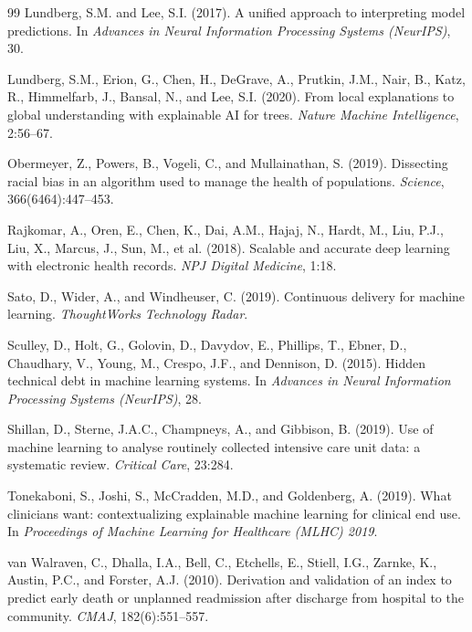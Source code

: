 \documentclass[11pt,letterpaper]{article}
\begin{document}
\begin{thebibliography}{99}
Lundberg, S.M. and Lee, S.I. (2017).
\newblock A unified approach to interpreting model predictions.
\newblock In \textit{Advances in Neural Information Processing Systems (NeurIPS)}, 30.

Lundberg, S.M., Erion, G., Chen, H., DeGrave, A., Prutkin, J.M., Nair, B., Katz, R., Himmelfarb, J., Bansal, N., and Lee, S.I. (2020).
\newblock From local explanations to global understanding with explainable AI for trees.
\newblock \textit{Nature Machine Intelligence}, 2:56--67.

Obermeyer, Z., Powers, B., Vogeli, C., and Mullainathan, S. (2019).
\newblock Dissecting racial bias in an algorithm used to manage the health of populations.
\newblock \textit{Science}, 366(6464):447--453.

Rajkomar, A., Oren, E., Chen, K., Dai, A.M., Hajaj, N., Hardt, M., Liu, P.J., Liu, X., Marcus, J., Sun, M., et al. (2018).
\newblock Scalable and accurate deep learning with electronic health records.
\newblock \textit{NPJ Digital Medicine}, 1:18.

Sato, D., Wider, A., and Windheuser, C. (2019).
\newblock Continuous delivery for machine learning.
\newblock \textit{ThoughtWorks Technology Radar}.

Sculley, D., Holt, G., Golovin, D., Davydov, E., Phillips, T., Ebner, D., Chaudhary, V., Young, M., Crespo, J.F., and Dennison, D. (2015).
\newblock Hidden technical debt in machine learning systems.
\newblock In \textit{Advances in Neural Information Processing Systems (NeurIPS)}, 28.

Shillan, D., Sterne, J.A.C., Champneys, A., and Gibbison, B. (2019).
\newblock Use of machine learning to analyse routinely collected intensive care unit data: a systematic review.
\newblock \textit{Critical Care}, 23:284.

Tonekaboni, S., Joshi, S., McCradden, M.D., and Goldenberg, A. (2019).
\newblock What clinicians want: contextualizing explainable machine learning for clinical end use.
\newblock In \textit{Proceedings of Machine Learning for Healthcare (MLHC) 2019}.

van Walraven, C., Dhalla, I.A., Bell, C., Etchells, E., Stiell, I.G., Zarnke, K., Austin, P.C., and Forster, A.J. (2010).
\newblock Derivation and validation of an index to predict early death or unplanned readmission after discharge from hospital to the community.
\newblock \textit{CMAJ}, 182(6):551--557.


\end{thebibliography}
\end{document}

